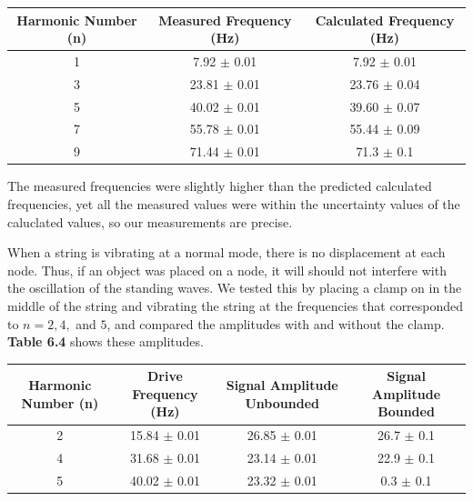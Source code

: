 \documentclass[11pt]{report}
\begin{document}
\begin{center}
    \begin{tabular}{| c | c | c |}
        \hline
        Harmonic Number (n) & Measured Frequency (Hz) & Calculated Frequency (Hz) \\
        \hline
        1 & 7.92 $\pm$ 0.01 & 7.92 $\pm$ 0.01\\
        \hline
        3 & 23.81 $\pm$ 0.01 & 23.76 $\pm$ 0.04\\
        \hline
        5 & 40.02 $\pm$ 0.01 & 39.60 $\pm$ 0.07\\
        \hline
        7 & 55.78 $\pm$ 0.01 & 55.44 $\pm$ 0.09 \\
        \hline
        9 &  71.44 $\pm$ 0.01 & 71.3 $\pm$ 0.1 \\
        \hline
    \end{tabular}
\end{center}

\setlength{\parindent}{5ex}
The measured frequencies were slightly higher than the predicted calculated
frequencies, yet all the measured values were within the uncertainty values of
the caluclated values, so our measurements are precise.

When a string is vibrating at a normal mode, there is no displacement at each
node.  Thus, if an object was placed on a node, it will should not interfere
with the oscillation of the standing waves. We tested this by placing a clamp 
on in the middle of the string and vibrating the string at the frequencies that
corresponded to $n=2, 4,$ and $5$, and compared the amplitudes with and without the
clamp.  \textbf{Table 6.4} shows these amplitudes.

\begin{center}
    \begin{tabular}{| c | c | c | c |}
        \hline
        Harmonic Number (n) & Drive Frequency (Hz) & Signal Amplitude Unbounded
                            & Signal Amplitude Bounded \\
        \hline
        2 & 15.84 $\pm$ 0.01 & 26.85 $\pm$ 0.01 & 26.7 $\pm$ 0.1\\
        \hline
        4 & 31.68 $\pm$ 0.01 & 23.14 $\pm$ 0.01 & 22.9 $\pm$ 0.1  \\
        \hline
        5 & 40.02 $\pm$ 0.01 & 23.32 $\pm$ 0.01 & 0.3 $\pm$ 0.1 \\
        \hline
    \end{tabular}
\end{center}
\end{document}
